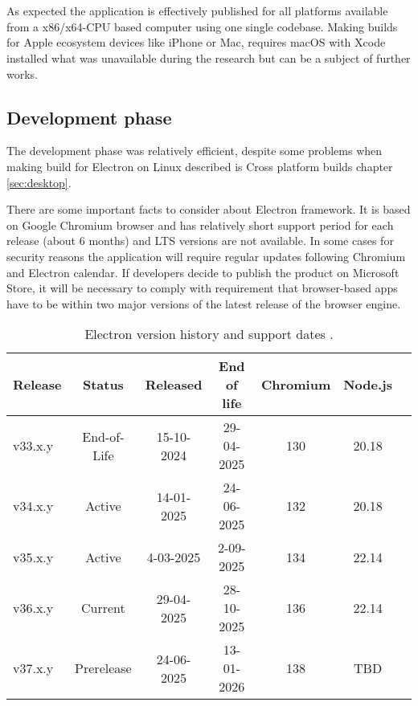 \chapter{}%
\label{ch:results}

As expected the application is effectively published for all platforms available from a x86/x64-CPU based computer using one single codebase. Making builds for Apple ecosystem devices like iPhone or Mac, requires macOS with Xcode installed what was unavailable during the research but can be a subject of further works.


\section{{Development phase}}%
\label{sec:development_evaluation}

The development phase was relatively efficient, despite some problems when making build for Electron on Linux described is Cross platform builds chapter \ref{sec:desktop}.


There are some important facts to consider about Electron framework. It is based on Google Chromium browser and has relatively short support period for each release (about 6 months) and LTS versions are not available. In some cases for security reasons the application will require regular updates following Chromium and Electron calendar. If developers decide to publish the product on Microsoft Store, it will be necessary to comply with requirement that  browser-based apps have to be within two major versions of the latest release of the browser engine\autocite{MSstoreElectron}.

\begin{table}[H]
    \centering
    \begin{tabular}{lcccccc}
        \toprule
        Release & Status & Released & End of life & Chromium & Node.js\\
        \midrule
        v33.x.y  &  End-of-Life  &  15-10-2024  &  29-04-2025  &  130  &  20.18   \\
        v34.x.y  &  Active  &  14-01-2025  &  24-06-2025  &  132  &  20.18   \\
        v35.x.y  &  Active  &  4-03-2025  &  2-09-2025  &  134  &  22.14   \\
        v36.x.y  &  Current  &  29-04-2025  &  28-10-2025  &  136  &  22.14   \\
        v37.x.y  &  Prerelease  &  24-06-2025  &  13-01-2026  &  138  &  TBD   \\ 
        \bottomrule
\end{tabular}
\caption[Electron version history]{\label{tab:electron}Electron version history and support dates \autocite{ElectronReleases}.
}
\end{table}


